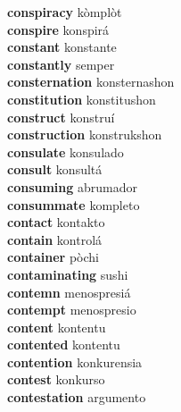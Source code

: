 \textbf{conspiracy } kòmplòt \\
\textbf{conspire } konspirá \\
\textbf{constant } konstante \\
\textbf{constantly } semper \\
\textbf{consternation } konsternashon \\
\textbf{constitution } konstitushon \\
\textbf{construct } konstruí \\
\textbf{construction } konstrukshon \\
\textbf{consulate } konsulado \\
\textbf{consult } konsultá \\
\textbf{consuming } abrumador \\
\textbf{consummate } kompleto \\
\textbf{contact } kontakto \\
\textbf{contain } kontrolá \\
\textbf{container } pòchi \\
\textbf{contaminating } sushi \\
\textbf{contemn } menospresiá \\
\textbf{contempt } menospresio \\
\textbf{content } kontentu \\
\textbf{contented } kontentu \\
\textbf{contention } konkurensia \\
\textbf{contest } konkurso \\
\textbf{contestation } argumento \\
